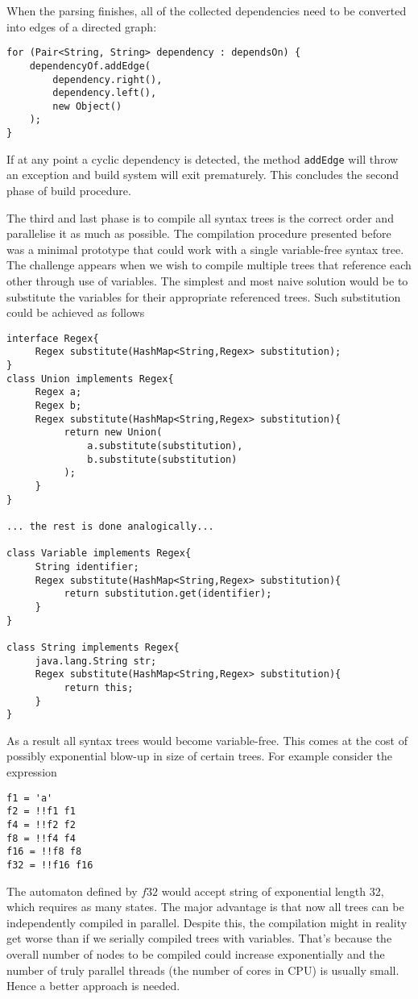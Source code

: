 When the parsing finishes, all of the collected dependencies need to be converted into edges of a directed graph:
\begin{lstlisting}
for (Pair<String, String> dependency : dependsOn) {
    dependencyOf.addEdge(
        dependency.right(), 
        dependency.left(), 
        new Object()
    );
}
\end{lstlisting}
If at any point a cyclic dependency is detected, the method \texttt{addEdge} will throw an exception and build system will exit prematurely.
This concludes the second phase of build procedure. 

The third and last phase is to compile all syntax trees is the correct order and parallelise it as much as possible. The compilation procedure presented before was a minimal prototype that could work with a single variable-free syntax tree.
The challenge appears when we wish to compile multiple trees that reference each other through use of variables. The simplest and most naive solution would be to substitute the variables for their appropriate referenced trees.
Such substitution could be achieved as follows
\begin{lstlisting}
interface Regex{
     Regex substitute(HashMap<String,Regex> substitution);
}
class Union implements Regex{
     Regex a; 
     Regex b;
     Regex substitute(HashMap<String,Regex> substitution){
          return new Union(
              a.substitute(substitution),
              b.substitute(substitution)
          );
     }
}

... the rest is done analogically...

class Variable implements Regex{
     String identifier;
     Regex substitute(HashMap<String,Regex> substitution){
          return substitution.get(identifier);
     }
}

class String implements Regex{
     java.lang.String str;
     Regex substitute(HashMap<String,Regex> substitution){
          return this;
     }
}
\end{lstlisting}
 As a result all syntax trees would become variable-free. This comes at the cost of possibly exponential blow-up in size of certain trees. For example consider the expression
 \begin{lstlisting}
f1 = 'a'
f2 = !!f1 f1
f4 = !!f2 f2
f8 = !!f4 f4
f16 = !!f8 f8
f32 = !!f16 f16
 \end{lstlisting}
The automaton defined by $f32$ would accept string of exponential length 32, which requires as many states.
 The major advantage is that now all trees can be independently compiled in parallel. Despite this, the compilation might in reality get worse than if we serially compiled trees with variables. That's because the overall number of nodes to be compiled could increase exponentially and the number of truly parallel threads (the number of cores in CPU) is usually small. Hence a better approach is needed. 
 
